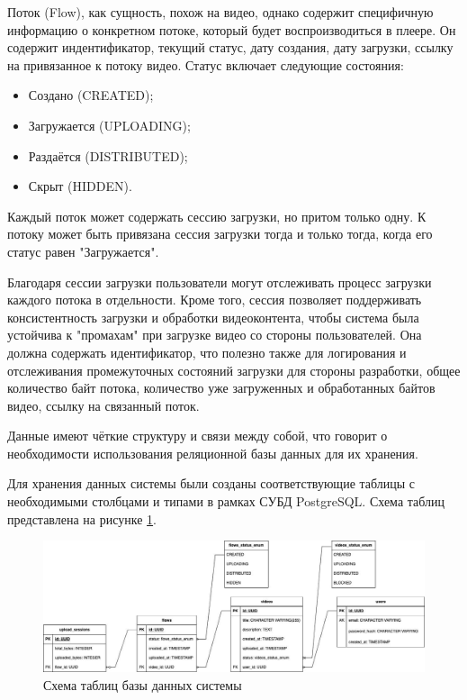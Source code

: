 	Поток (Flow), как сущность, похож на видео, однако содержит специфичную информацию о конкретном потоке, который будет воспроизводиться в плеере. Он содержит индентификатор, текущий статус, дату создания, дату загрузки, ссылку на привязанное к потоку видео. Статус включает следующие состояния:
	\begin{itemize}[label=$\bullet$]
		\item Создано (CREATED);
		\item Загружается (UPLOADING);
		\item Раздаётся (DISTRIBUTED);
		\item Скрыт (HIDDEN).
	\end{itemize}

	Каждый поток может содержать сессию загрузки, но притом только одну. К потоку может быть привязана сессия загрузки тогда и только тогда, когда его статус равен "Загружается".

	Благодаря сессии загрузки пользователи могут отслеживать процесс загрузки каждого потока в отдельности. Кроме того, сессия позволяет поддерживать консистентность загрузки и обработки видеоконтента, чтобы система была устойчива к "промахам" при загрузке видео со стороны пользователей. Она должна содержать идентификатор, что полезно также для логирования и отслеживания промежуточных состояний загрузки для стороны разработки, общее количество байт потока, количество уже загруженных и обработанных байтов видео, ссылку на связанный поток.
	
	Данные имеют чёткие структуру и связи между собой, что говорит о необходимости использования реляционной базы данных для их хранения.

	Для хранения данных системы были созданы соответствующие таблицы с необходимыми столбцами и типами в рамках СУБД PostgreSQL. Схема таблиц представлена на рисунке \ref{fig:db_scheme}.
	\begin{figure}[ht!] 
		\center
		\includegraphics [scale=0.37] {my_folder/images//db_scheme}
		\caption{Схема таблиц базы данных системы} 
		\label{fig:db_scheme}  
	\end{figure}


